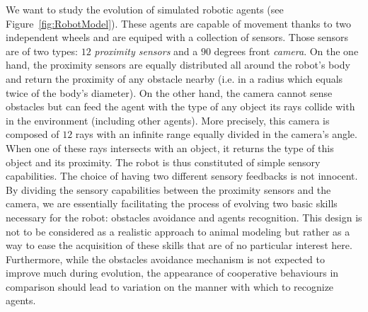         We want to study the evolution of simulated robotic agents (see Figure~\ref{fig:RobotModel}). These agents are capable of movement thanks to two independent wheels and are equiped with a collection of sensors. Those sensors are of two types: $12$ \emph{proximity sensors} and a $90$ degrees front \emph{camera}. On the one hand, the proximity sensors are equally distributed all around the robot's body and return the proximity of any obstacle nearby (i.e. in a radius which equals twice of the body's diameter). On the other hand, the camera cannot sense obstacles but can feed the agent with the type of any object its rays collide with in the environment (including other agents). More precisely, this camera is composed of $12$ rays with an infinite range equally divided in the camera's angle. When one of these rays intersects with an object, it returns the type of this object and its proximity. The robot is thus constituted of simple sensory capabilities. The choice of having two different sensory feedbacks is not innocent. By dividing the sensory capabilities between the proximity sensors and the camera, we are essentially facilitating the process of evolving two basic skills necessary for the robot: obstacles avoidance and agents recognition. This design is not to be considered as a realistic approach to animal modeling but rather as a way to ease the acquisition of these skills that are of no particular interest here. Furthermore, while the obstacles avoidance mechanism is not expected to improve much during evolution, the appearance of cooperative behaviours in comparison should lead to variation on the manner with which to recognize agents.

